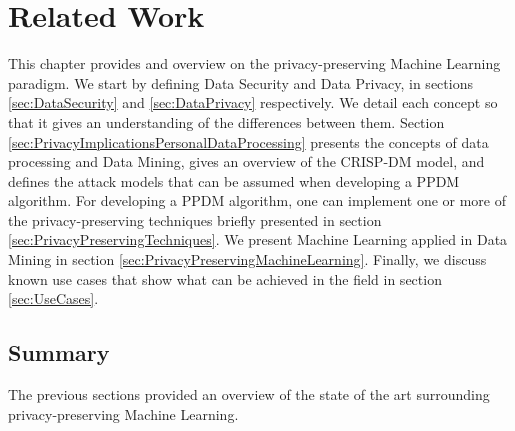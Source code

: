 %

\acresetall

\chapter{Related Work}
\label{ch:RelatedWork}


This chapter provides and overview on the privacy-preserving Machine Learning paradigm.
We start by defining Data Security and Data Privacy, in sections \ref{sec:DataSecurity} and \ref{sec:DataPrivacy} respectively. We detail each concept so that it gives an understanding of the differences between them.
Section \ref{sec:PrivacyImplicationsPersonalDataProcessing} presents the concepts of data processing and Data Mining, gives an overview of the CRISP-DM model, and defines the attack models that can be assumed when developing a \ac{PPDM} algorithm.
For developing a \ac{PPDM} algorithm, one can implement one or more of the privacy-preserving techniques briefly presented in section \ref{sec:PrivacyPreservingTechniques}. 
We present Machine Learning applied in Data Mining in section \ref{sec:PrivacyPreservingMachineLearning}. Finally, we discuss known use cases that show what can be achieved in the field in section \ref{sec:UseCases}.









\section{Summary}
\label{sec:SummaryRelatedWork}

The previous sections provided an overview of the state of the art surrounding privacy-preserving Machine Learning.

